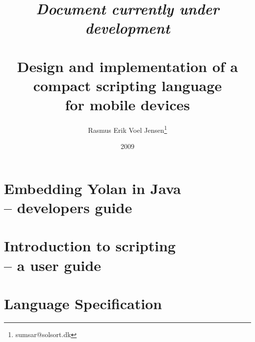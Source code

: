 \documentclass[11pt]{report}
\title{
\emph{Document currently under development} \\ ~ \\
Design and implementation of a \\
compact scripting language \\ 
for mobile devices}
\author{
  Rasmus Erik Voel Jensen\footnote{
    sumsar@solsort.dk
  }
}
\date{2009}
\begin{document}

\maketitle

\setcounter{tocdepth}{1}
\tableofcontents
\nocite{sicp}


\chapter{Embedding Yolan in Java \\ -- developers guide}


\chapter{Introduction to scripting \\ -- a user guide}


\chapter{Language Specification}


\newpage
{}



\appendix

\newpage
{}
\printindex
\end{document}
